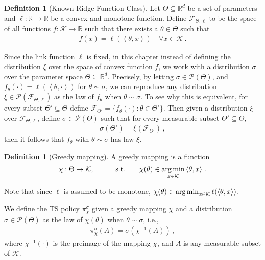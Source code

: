 \documentclass[letter, 12pt]{report}
\newcommand{\R}{\mathbb R}
\newcommand{\argmin}{\operatornamewithlimits{arg\,min}}
\newcommand{\ip}[1]{\left \langle #1 \right \rangle}
\newcommand{\cK}{\mathcal K}
\newcommand{\sF}{\mathscr F}
\newcommand{\cP}{\mathcal P}
\newcommand{\sP}{\mathscr P}
\newcommand{\1}{\mathbf{1}}
\newcommand{\ts}{\textsc{TS}\xspace}
\newcommand{\sthat}{\qquad\text{s.t.}\qquad}
\theoremstyle{plain}
\theoremstyle{definition}
\newtheorem{definition}[theorem]{Definition}
\theoremstyle{remark}
\begin{document}
\begin{definition}[Known Ridge Function Class]
    Let $\Theta \subseteq \R^d$ be a set of parameters and $\ell:\R\to\R$ be a convex and monotone function.
    Define $\sF_{\Theta, \ell}$ to be the space of all functions $f:\cK \to \R$ such that
    there exists a $\theta \in \Theta$ such that
    \begin{align*}
        f(x) =\ell(\ip{\theta, x})\quad \forall x \in \cK\,.
    \end{align*}
\end{definition}
Since the link function $\ell$ is fixed, in this chapter instead of defining the distribution $\xi$ over the space of convex function $f$, we work with a distribution $\sigma$ over the parameter space $\Theta \subseteq \R^d$.
Precisely, by letting $\sigma \in \sP(\Theta)$, and $f_\theta(\cdot) = \ell(\ip{\theta, \cdot})$
for $\theta \sim \sigma$, we can reproduce any distribution $\xi \in \sP\left(\sF_{\Theta, \ell}\right)$ as the law of $f_\theta$ when $\theta \sim \sigma$.
To see why this is equivalent, for every subset $\Theta' \subseteq \Theta$ define $\sF_{\Theta'} = \{f_\theta(\cdot) : \theta \in \Theta'\}$.
Then given a distribution $\xi$ over $\sF_{\Theta, \ell}$, define $\sigma \in \cP(\Theta)$ such that for every measurable subset $\Theta'\subseteq \Theta$,
\begin{align}
    \sigma\left(\Theta'\right)= \xi\left(\sF_{\Theta'}\right)\,, \label{eq:sigma-xi}
\end{align}
then it follows that $f_\theta$ with $\theta \sim \sigma$ has law $\xi$.

\begin{definition}[Greedy mapping]
    A greedy mapping is a function
    \begin{align}
        \chi: \Theta \to \cK, \quad \sthat \chi(\theta) \in \argmin_{x \in \cK} \ip{\theta, x}\,.
        \label{eq:ts-mapping}
    \end{align}
\end{definition}
Note that since $\ell$ is assumed to be monotone, $\chi(\theta) \in \argmin_{x \in \cK} \ell(\ip{\theta, x})$.

We define the \ts{} policy $\pi_\chi^\sigma$ given a greedy mapping $\chi$ and a distribution $\sigma \in \sP(\Theta)$ as the law of $\chi(\theta)$ when $\theta \sim \sigma$, i.e.,
\begin{align*}
    \pi^\sigma_\chi(A) = \sigma\left(\chi^{-1}(A)\right)\,,
\end{align*}
where $\chi^{-1}(\cdot)$ is the preimage of the mapping $\chi$,
and $A$ is any measurable subset of $\cK$.
\end{document}
